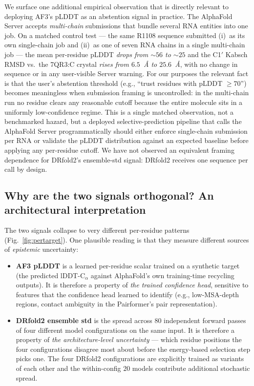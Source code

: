 \documentclass[conference,10pt]{IEEEtran}
\begin{document}
We surface one additional empirical observation that is directly
relevant to deploying AF3's pLDDT as an abstention signal in
practice. The AlphaFold Server accepts \emph{multi-chain} submissions
that bundle several RNA entities into one job. On a matched control
test --- the same R1108 sequence submitted (i)~as its own
single-chain job and (ii)~as one of seven RNA chains in a single
multi-chain job --- the mean per-residue pLDDT \emph{drops from
$\sim$$56$ to $\sim$$25$} and the C1$'$ Kabsch RMSD vs.\ the 7QR3:C
crystal \emph{rises from $6.5$~\AA{} to $25.6$~\AA{}}, with no
change in sequence or in any user-visible Server warning. For our
purposes the relevant fact is that the user's abstention threshold
(e.g., ``trust residues with pLDDT $\geq 70$'') becomes meaningless
when submission framing is uncontrolled: in the multi-chain run no
residue clears any reasonable cutoff because the entire molecule
sits in a uniformly low-confidence regime. This is a single matched
observation, not a benchmarked hazard, but a deployed selective-prediction
pipeline that calls the AlphaFold Server programmatically should
either enforce single-chain submission per RNA or validate the
pLDDT distribution against an expected baseline before applying any
per-residue cutoff. We have not observed an equivalent
framing dependence for DRfold2's ensemble-std signal: DRfold2
receives one sequence per call by design.

\subsection{Why are the two signals orthogonal? An architectural
interpretation}

The two signals collapse to very different per-residue patterns
(Fig.~\ref{fig:pertarget}). One plausible reading is that they
measure different sources of \emph{epistemic} uncertainty:

\begin{itemize}
\item \textbf{AF3 pLDDT} is a learned per-residue scalar trained on a
synthetic target (the predicted lDDT-C$_\alpha$ against AlphaFold's
own training-time recycling outputs). It is therefore a property of
\emph{the trained confidence head}, sensitive to features that the
confidence head learned to identify (e.g., low-MSA-depth regions,
contact ambiguity in the Pairformer's pair representation).
\item \textbf{DRfold2 ensemble std} is the spread across $80$
independent forward passes of four different model configurations
on the same input. It is therefore a property of \emph{the
architecture-level uncertainty} --- which residue positions the
four configurations disagree most about before the energy-based
selection step picks one. The four DRfold2 configurations are
explicitly trained as variants of each other and the within-config
$20$ models contribute additional stochastic spread.
\end{itemize}
\end{document}
